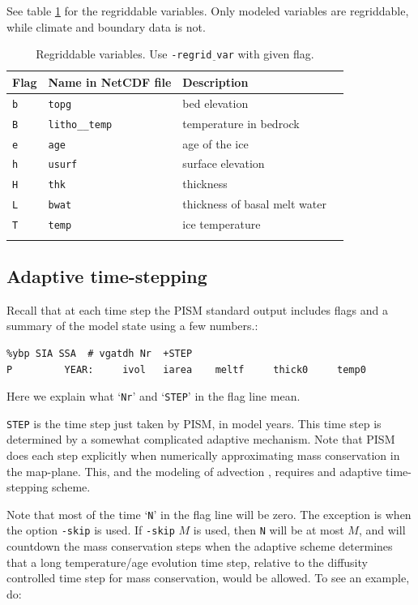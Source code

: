\documentclass[11pt,final]{amsart}
\newcommand{\und}{\_\!\_}
\begin{document}
See table \ref{tab:regridvar} for the regriddable variables.  Only modeled variables are regriddable, while climate and boundary data is not.

\begin{table}[ht]
\caption{Regriddable variables.\index{regrid\und vars}  Use \texttt{-regrid$\underline{\phantom{b}}$var} with given flag.}\label{tab:regridvar}
\begin{tabular}{@{}llll}\hline
\textbf{Flag} & \textbf{Name in NetCDF file} & \textbf{Description}\\ \hline
\verb|b| & \texttt{topg}       & bed elevation \\
\verb|B| & \texttt{litho\und temp} & temperature in bedrock \\
\verb|e| & \texttt{age}        & age of the ice \\
\verb|h| & \texttt{usurf}      & surface elevation \\
\verb|H| & \texttt{thk}        & thickness \\
\verb|L| & \texttt{bwat}       & thickness of basal melt water \\
\verb|T| & \texttt{temp}       & ice temperature \\
\hline
\normalsize
\end{tabular}
\end{table}


\subsection{Adaptive time-stepping} \label{subsect:adapt} Recall that at each time step the PISM standard output includes flags and a summary of the model state using a few numbers.:
\begin{verbatim}
%ybp SIA SSA  # vgatdh Nr  +STEP
P         YEAR:     ivol   iarea    meltf     thick0     temp0
\end{verbatim}
Here we explain what `\verb|Nr|' and `\verb|STEP|' in the flag line mean.

\verb|STEP| is the time step just taken by PISM, in model years.  This time step is determined by a somewhat complicated adaptive mechanism.  Note that PISM does each step explicitly when numerically approximating mass conservation in the map-plane.  This, and the modeling of advection \cite{BBL}, requires and adaptive time-stepping scheme.

Note that most of the time `\verb|N|' in the flag line will be zero.  The exception is when the option \verb|-skip| is used.  If \verb|-skip| $M$ is used, then \verb|N| will be at most $M$, and will countdown the mass conservation steps when the adaptive scheme determines that a long temperature/age evolution time step, relative to the diffusity controlled time step for mass conservation, would be allowed.  To see an example, do:
\end{document}
